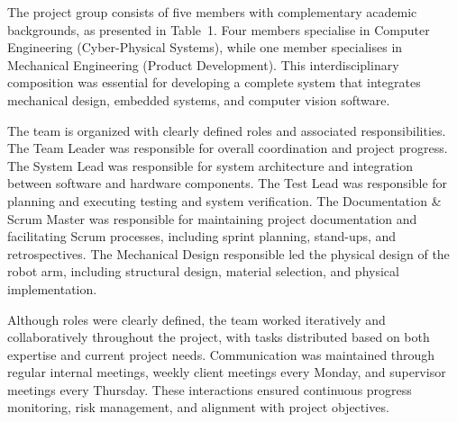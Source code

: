 
The project group consists of five members with complementary academic backgrounds, 
as presented in Table~1. Four members specialise in Computer Engineering 
(Cyber-Physical Systems), while one member specialises in Mechanical Engineering 
(Product Development). This interdisciplinary composition was essential for developing 
a complete system that integrates mechanical design, embedded systems, and computer 
vision software.

The team is organized with clearly defined roles and associated responsibilities. 
The Team Leader was responsible for overall coordination and project progress. 
The System Lead was responsible for system architecture and integration between 
software and hardware components. The Test Lead was responsible for planning and 
executing testing and system verification. The Documentation \& Scrum Master was 
responsible for maintaining project documentation and facilitating Scrum processes, 
including sprint planning, stand-ups, and retrospectives. The Mechanical Design 
responsible led the physical design of the robot arm, including structural design, 
material selection, and physical implementation.

Although roles were clearly defined, the team worked iteratively and collaboratively 
throughout the project, with tasks distributed based on both expertise and current 
project needs. Communication was maintained through regular internal meetings, weekly 
client meetings every Monday, and supervisor meetings every Thursday. These interactions 
ensured continuous progress monitoring, risk management, and alignment with 
project objectives.